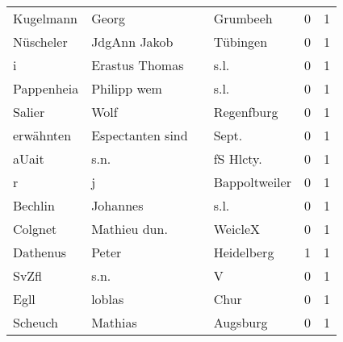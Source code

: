 \begin{tabular}{llllrr}
                Kugelmann &                              Georg &             &                                    Grumbeeh &          0 &         1 \\
                Nüscheler &                       JdgAnn Jakob &             &                                    Tübingen &          0 &         1 \\
                        i &                     Erastus Thomas &             &                                        s.l. &          0 &         1 \\
               Pappenheia &                        Philipp wem &             &                                        s.l. &          0 &         1 \\
                   Salier &                               Wolf &             &                                  Regenfburg &          0 &         1 \\
                erwähnten &                   Espectanten sind &             &                                      Sept.  &          0 &         1 \\
                    aUait &                               s.n. &             &                                  fS Hlcty.  &          0 &         1 \\
                        r &                                  j &             &                               Bappoltweiler &          0 &         1 \\
                  Bechlin &                           Johannes &             &                                        s.l. &          0 &         1 \\
                  Colgnet &                       Mathieu dun. &             &                                     WeicleX &          0 &         1 \\
                 Dathenus &                              Peter &             &                                  Heidelberg &          1 &         1 \\
                    SvZfl &                               s.n. &             &                                           V &          0 &         1 \\
                     Egll &                             loblas &             &                                        Chur &          0 &         1 \\
                  Scheuch &                            Mathias &             &                                    Augsburg &          0 &         1 \\

\end{tabular}
